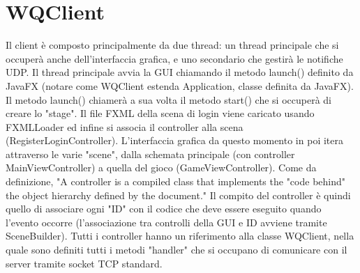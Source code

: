 \documentclass{article}
\begin{document}
\section{WQClient}
Il client è composto principalmente da due thread: un thread principale che si occuperà anche dell'interfaccia grafica, e uno secondario che gestirà le notifiche UDP. Il thread principale avvia la GUI chiamando il metodo launch() definito da JavaFX (notare come WQClient estenda Application, classe definita da JavaFX). Il metodo launch() chiamerà a sua volta il metodo start() che si occuperà di creare lo "stage". Il file FXML della scena di login viene caricato usando FXMLLoader ed infine si associa il controller alla scena (RegisterLoginController). L'interfaccia grafica da questo momento in poi itera attraverso le varie "scene", dalla schemata principale (con controller MainViewController) a quella del gioco (GameViewController). Come da definizione, "A controller is a compiled class that implements the "code behind" the object hierarchy defined by the document." \cite{javafxDocumentation} Il compito del controller è quindi quello di associare ogni "ID" con il codice che deve essere eseguito quando l'evento occorre (l'associazione tra controlli della GUI e ID avviene tramite SceneBuilder). Tutti i controller hanno un riferimento alla classe WQClient, nella quale sono definiti tutti i metodi "handler" che si occupano di comunicare con il server tramite socket TCP standard.
\end{document}

